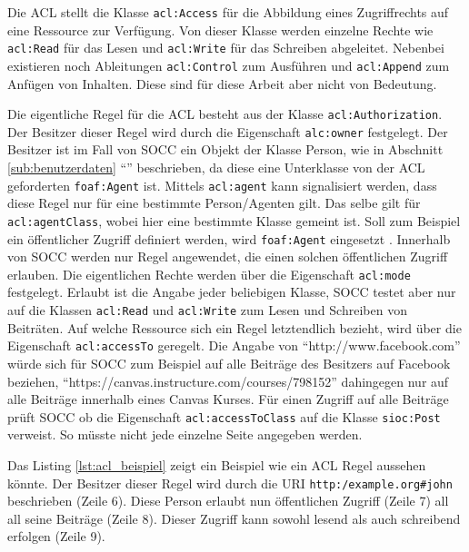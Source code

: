 Die ACL stellt die Klasse \texttt{acl:Access} für die Abbildung eines Zugriffrechts auf eine Ressource zur Verfügung. Von dieser Klasse werden einzelne Rechte wie \texttt{acl:Read} für das Lesen und \texttt{acl:Write} für das Schreiben abgeleitet. Nebenbei existieren noch Ableitungen \texttt{acl:Control} zum Ausführen und \texttt{acl:Append} zum Anfügen von Inhalten. Diese sind für diese Arbeit aber nicht von Bedeutung.

Die eigentliche Regel für die ACL besteht aus der Klasse \texttt{acl:Authorization}. Der Besitzer dieser Regel wird durch die Eigenschaft \texttt{alc:owner} festgelegt. Der Besitzer ist im Fall von SOCC  ein Objekt der Klasse Person, wie in Abschnitt \ref{sub:benutzerdaten} \enquote{} beschrieben, da diese eine Unterklasse von der ACL geforderten \texttt{foaf:Agent} ist. Mittels \texttt{acl:agent} kann signalisiert werden, dass diese Regel nur für eine bestimmte Person/Agenten gilt. Das selbe gilt für \texttt{acl:agentClass}, wobei hier eine bestimmte Klasse gemeint ist. Soll zum Beispiel ein öffentlicher Zugriff definiert werden, wird \texttt{foaf:Agent} eingesetzt \cite[\enquote{Public Access}]{wiki:wacl}. Innerhalb von SOCC werden nur Regel angewendet, die einen solchen öffentlichen Zugriff erlauben. Die eigentlichen Rechte werden über die Eigenschaft \texttt{acl:mode} festgelegt. Erlaubt ist die Angabe jeder beliebigen Klasse, SOCC testet aber nur auf die Klassen \texttt{acl:Read} und \texttt{acl:Write} zum Lesen und Schreiben von Beiträten. Auf welche Ressource sich ein Regel letztendlich bezieht, wird über die Eigenschaft \texttt{acl:accessTo} geregelt. Die Angabe von \enquote{http://www.facebook.com} würde sich für SOCC zum Beispiel auf alle Beiträge des Besitzers auf Facebook beziehen, \enquote{https://canvas.instructure.com/courses/798152} dahingegen nur auf alle Beiträge innerhalb eines Canvas Kurses. Für einen Zugriff auf alle Beiträge prüft SOCC ob die Eigenschaft \texttt{acl:accessToClass} auf die Klasse \texttt{sioc:Post} verweist. So müsste nicht jede einzelne Seite angegeben werden.


Das Listing \ref{lst:acl_beispiel} zeigt ein Beispiel wie ein ACL Regel aussehen könnte. Der Besitzer dieser Regel wird durch die URI \texttt{http:/example.org\#john} beschrieben (Zeile 6). Diese Person erlaubt nun öffentlichen Zugriff (Zeile 7) all all seine Beiträge (Zeile 8). Dieser Zugriff kann sowohl lesend als auch schreibend erfolgen (Zeile 9).

